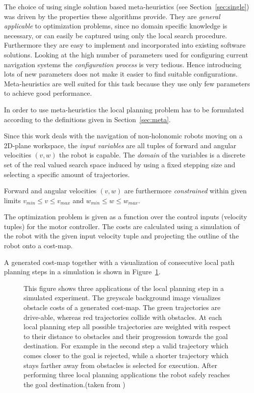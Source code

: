 The choice of using single solution based meta-heuristics (see Section~\ref{sec:single}) was driven by the properties these algorithms provide. 
They are \emph{general applicable} to optimization problems, since no domain specific knowledge is necessary, or can easily be captured using only the local search procedure.
Furthermore they are easy to implement and incorporated into existing software solutions.
Looking at the high number of parameters used for configuring current navigation systems the \emph{configuration process} is very tedious. 
Hence introducing lots of new parameters does not make it easier to find suitable configurations.
Meta-heuristics are well suited for this task because they use only few parameters to achieve good performance.  

In order to use meta-heuristics the local planning problem has to be formulated according to the definitions given in Section~\ref{sec:meta}.

Since this work deals with the navigation of non-holonomic robots moving on a 2D-plane workspace, the \emph{input variables} are all tuples of forward and angular velocities $(v,w)$ the robot is capable.
The \emph{domain} of the variables is a discrete set of the real valued search space induced by using a fixed stepping size and selecting a specific amount of trajectories.
 
Forward and angular velocities $(v,w)$ are furthermore \emph{constrained} within given limits $v_{min} \leq v \leq v_{max}$ and $w_{min} \leq w \leq w_{max}$.

The optimization problem is given as a function over the control inputs (velocity tuples) for the motor controller. 
The costs are calculated using a simulation of the robot with the given input velocity tuple and projecting the outline of the robot onto a cost-map. 

A generated cost-map together with a visualization of consecutive local path planning steps in a simulation is shown in Figure~\ref{fig:fig_instances_detail}.
   
\begin{figure}[thpb]
     \footnotesize
      \centering
      \setlength\fboxsep{0pt}
      \setlength\fboxrule{0.5pt}
       \def\svgwidth{\textwidth}
       
		\caption[Local-path planning simulation.]{This figure shows three applications of the local planning step in a simulated experiment. The greyscale background image visualizes obstacle costs of a generated cost-map. The green trajectories are drive-able, whereas red trajectories collide with obstacles. At each local planning step all possible trajectories are weighted with respect to their distance to obstacles and their progression towards the goal destination. For example in the second step a valid trajectory which comes closer to the goal is rejected, while a shorter trajectory which stays farther away from obstacles is selected for execution. After performing three local planning applications the robot safely reaches the goal destination.(taken from \cite{myself})}
		\label{fig:fig_instances_detail}
\end{figure}

